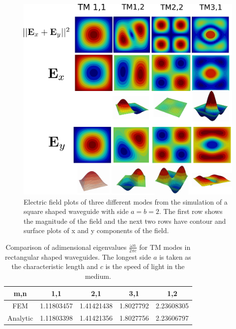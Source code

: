 \begin{figure}
\centering
\includegraphics[scale=0.1]{./img/square_waveguide.pdf}
\caption{Electric field plots of three different  modes from the simulation of a square shaped waveguide with side $a=b=2$. The first row shows the magnitude of the field and the next two rows have contour and surface plots of x and y components of the field.}
\label{fig:square_waveguide}
\end{figure}

\begin{table}
\begin{center}
\begin{tabular}{|c|c|c|c|c|}
\hline 
m,n & 1,1 & 2,1 & 3,1 & 1,2 \\ 
\hline 
FEM      & 1.11803457 & 1.41421438 & 1.8027792 &  2.23608305 \\
\hline 
Analytic & 1.11803398 & 1.41421356 & 1.8027756 &  2.23606797 \\
\hline 
\end{tabular} 
\caption{Comparison of adimensional eigenvalues $\frac{\omega a}{2\pi c}$ for TM modes in  rectangular shaped waveguides. The longest side $a$ is taken as the characteristic length and $c$ is the speed of light in the medium.}
\label{tab:rec_wav_comparison}
\end{center}
\end{table}

